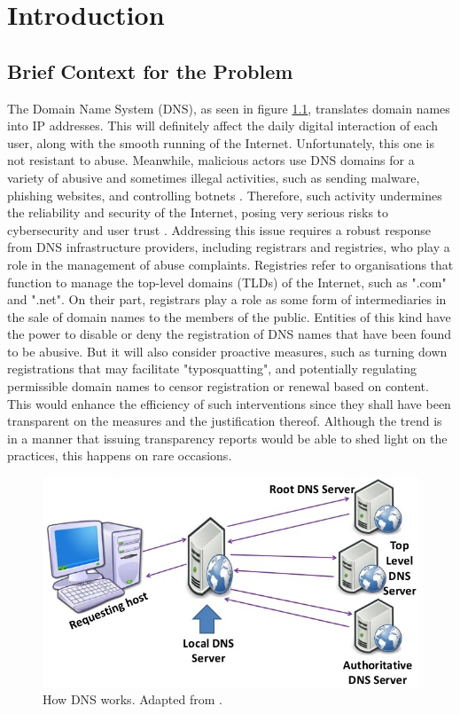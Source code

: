 \chapter{Introduction}


\section{Brief Context for the Problem}

The Domain Name System (DNS), as seen in figure \ref{fig:dnsIntro}, translates domain names into IP addresses. This will definitely affect the daily digital interaction of each user, along with the smooth running of the Internet. Unfortunately, this one is not resistant to abuse. Meanwhile, malicious actors use DNS domains for a variety of abusive and sometimes illegal activities, such as sending malware, phishing websites, and controlling botnets \cite{so2022}. Therefore, such activity undermines the reliability and security of the Internet, posing very serious risks to cybersecurity and user trust \cite{bayer2022}. Addressing this issue requires a robust response from DNS infrastructure providers, including registrars and registries, who play a role in the management of abuse complaints. Registries refer to organisations that function to manage the top-level domains (TLDs) of the Internet, such as ".com" and ".net". On their part, registrars play a role as some form of intermediaries in the sale of domain names to the members of the public. Entities of this kind have the power to disable or deny the registration of DNS names that have been found to be abusive. But it will also consider proactive measures, such as turning down registrations that may facilitate "typosquatting", and potentially regulating permissible domain names to censor registration or renewal based on content. This would enhance the efficiency of such interventions since they shall have been transparent on the measures and the justification thereof. Although the trend is in a manner that issuing transparency reports would be able to shed light on the practices, this happens on rare occasions.

\begin{figure}[H]
    \centering
    \includegraphics[width=0.4\linewidth]{introduction/dnsWork.jpg}
    \caption{How DNS works. Adapted from \cite{blanche2018understandingDNS}. }
    \label{fig:dnsIntro}
\end{figure}

